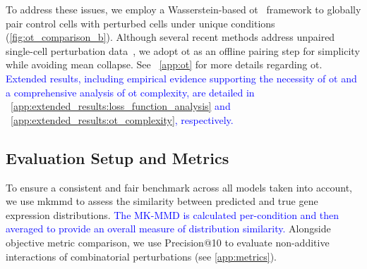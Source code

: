 \documentclass{article}
\begin{document}
To address these issues, we employ a Wasserstein-based \gls{ot}~\citep{cuturi2013sinkhorn,flamary2021pot} framework to globally pair control cells with perturbed cells under unique conditions (\cref{fig:ot_comparison_b}).
Although several recent methods address unpaired single-cell perturbation data~\citep{bunne2023learning,dong2023causal}, we adopt \gls{ot} as an offline pairing step for simplicity while avoiding mean collapse.
See ~\cref{app:ot} for more details regarding \gls{ot}.
\textcolor{blue}{
    Extended results, including empirical evidence supporting the necessity of \gls{ot} and a comprehensive analysis of \gls{ot} complexity, are detailed in ~\cref{app:extended_results:loss_function_analysis} and ~\cref{app:extended_results:ot_complexity}, respectively.
}


\subsection{Evaluation Setup and Metrics}
\label{subsec:eval_setup_metrics}

To ensure a consistent and fair benchmark across all models taken into account, we use \gls{mkmmd} to assess the similarity between predicted and true gene expression distributions.
\textcolor{blue}{The MK-MMD is calculated per-condition and then averaged to provide an overall measure of distribution similarity.}
Alongside objective metric comparison, we use Precision@10 to evaluate non-additive interactions of combinatorial perturbations (see \cref{app:metrics}).
\end{document}
